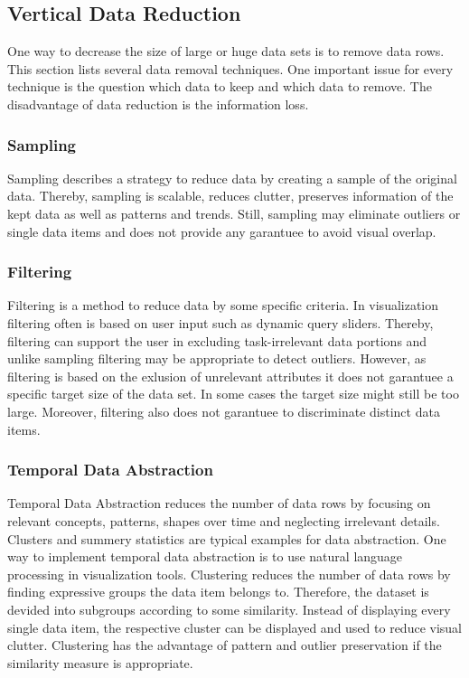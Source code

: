 \subsection{Vertical Data Reduction}
One way to decrease the size of large or huge data sets is to remove data rows. This section lists several data removal techniques. One important issue for every technique is the question which data to keep and which data to remove. The disadvantage of data reduction is the information loss.
\subsubsection*{Sampling}
Sampling describes a strategy to reduce data by creating a sample of the original data. Thereby, sampling is scalable, reduces clutter, preserves information of the kept data as well as patterns and trends\cite{PiringerHarald2011}. Still, sampling may eliminate outliers or single data items and does not provide any garantuee to avoid visual overlap. 
\subsubsection*{Filtering}
Filtering is a method to reduce data by some specific criteria. In visualization filtering often is based on user input such as dynamic query sliders. Thereby, filtering can support the user in excluding task-irrelevant data portions and unlike sampling filtering may be appropriate to detect outliers. However, as filtering is based on the exlusion of unrelevant attributes it does not garantuee a specific target size of the data set. In some cases the target size might still be too large. Moreover, filtering also does not garantuee to discriminate distinct data items\cite{PiringerHarald2011}.
\subsubsection*{Temporal Data Abstraction}
Temporal Data Abstraction\cite{Aigner2011} reduces the number of data rows by focusing on relevant concepts, patterns, shapes over time and neglecting irrelevant details. Clusters and summery statistics\cite{PiringerHarald2011} are typical examples for data abstraction.
One way to implement temporal data abstraction is to use natural language processing in visualization tools. 
Clustering reduces the number of data rows by finding expressive groups the data item belongs to. Therefore, the dataset is devided into subgroups according to some similarity. Instead of displaying every single data item, the respective cluster can be displayed and used to reduce visual clutter. Clustering has the advantage of pattern and outlier preservation if the similarity measure is appropriate.
